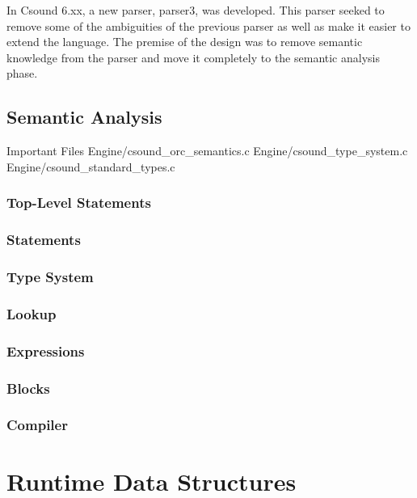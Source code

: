 \documentclass[]{book}
\begin{document}
In Csound 6.xx, a new parser, parser3, was developed.  This parser seeked to remove some of the ambiguities of the previous parser as well as make it easier to extend the language. The premise of the design was to remove semantic knowledge from the parser and move it completely to the semantic analysis phase.  



\subsection{Semantic Analysis}

\begin{bclogo}[couleur=blue!30,arrondi=0.1,ombre=true,logo=\bcetoile]
{Important Files}
Engine/csound\_orc\_semantics.c 
Engine/csound\_type\_system.c 
Engine/csound\_standard\_types.c 
\end{bclogo}

\subsubsection{Top-Level Statements}



\subsubsection {Statements}

\subsubsection{Type System}

\subsubsection{Lookup}

\subsubsection{Expressions}

\subsubsection{Blocks}

\subsubsection{Compiler}

\section{Runtime Data Structures}
\end{document}
